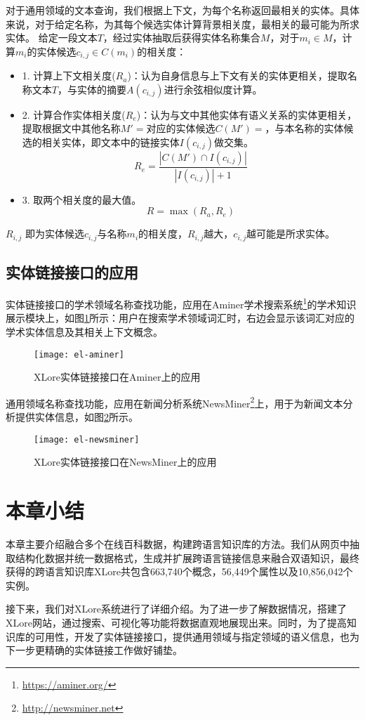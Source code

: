 对于通用领域的文本查询，我们根据上下文，为每个名称返回最相关的实体。具体来说，对于给定名称，为其每个候选实体计算背景相关度，最相关的最可能为所求实体。
给定一段文本$T$，经过实体抽取后获得实体名称集合$M$，对于$m_i \in M$，计算$m_i$的实体候选$c_{i,j} \in C(m_i)$的相关度：
\begin{itemize}
\item 1.  计算上下文相关度($R_a$)：认为自身信息与上下文有关的实体更相关，提取名称文本$T$，与实体的摘要$A(c_{i,j})$进行余弦相似度计算。

\item 2.  计算合作实体相关度($R_e$)：认为与文中其他实体有语义关系的实体更相关，提取根据文中其他名称$M'=$对应的实体候选$C(M') = $，与本名称的实体候选的相关实体，即文本中的链接实体$I(c_{i,j})$做交集。
\begin{equation}
{ R }_{ e }=\frac { \left| C\left( M' \right) \cap I\left( { c }_{ i,j } \right)  \right|  }{ \left| I\left( { c }_{ i,j } \right)  \right| +1 }
\end{equation}

\item 3.  取两个相关度的最大值。
\begin{equation}
R = \max{ \left(R_a, R_e \right)}
\end{equation}
\end{itemize}
$R_{i,j}$ 即为实体候选$c_{i,j}$与名称$m_i$的相关度，$R_{i,j}$越大，$c_{i,j}$越可能是所求实体。

\subsection{实体链接接口的应用}
实体链接接口的学术领域名称查找功能，应用在Aminer学术搜索系统\footnote{\url{https://aminer.org/}}的学术知识展示模块上，如图\ref{fig:el-aminer}所示：用户在搜索学术领域词汇时，右边会显示该词汇对应的学术实体信息及其相关上下文概念。
\begin{figure}[ht]
  \centering
  \texttt{[image: el-aminer]}
  \caption{XLore实体链接接口在Aminer上的应用}
  \label{fig:el-aminer}
\end{figure}

通用领域名称查找功能，应用在新闻分析系统NewsMiner\footnote{\url{http://newsminer.net}}上，用于为新闻文本分析提供实体信息，如图\ref{fig:el-newsminer}所示。
\begin{figure}[ht]
  \centering
  \texttt{[image: el-newsminer]}
  \caption{XLore实体链接接口在NewsMiner上的应用}
  \label{fig:el-newsminer}
\end{figure}

\section{本章小结}
本章主要介绍融合多个在线百科数据，构建跨语言知识库的方法。我们从网页中抽取结构化数据并统一数据格式，生成并扩展跨语言链接信息来融合双语知识，最终获得的跨语言知识库XLore共包含663,740个概念，56,449个属性以及10,856,042个实例。

接下来，我们对XLore系统进行了详细介绍。为了进一步了解数据情况，搭建了XLore网站，通过搜索、可视化等功能将数据直观地展现出来。同时，为了提高知识库的可用性，开发了实体链接接口，提供通用领域与指定领域的语义信息，也为下一步更精确的实体链接工作做好铺垫。

